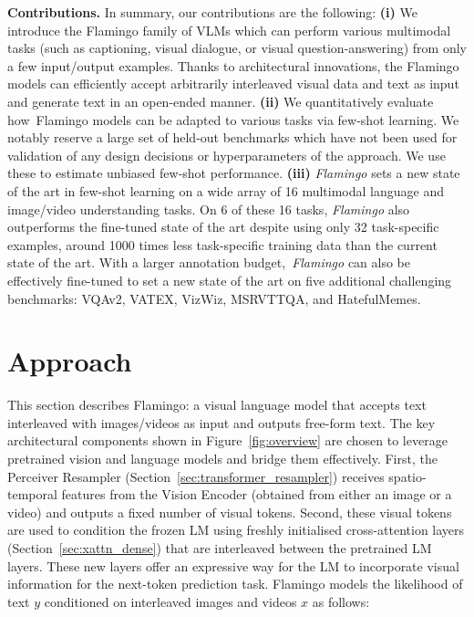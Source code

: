 \textbf{Contributions.}
In summary, our contributions are the following:
\textbf{(i)} We introduce the Flamingo family of VLMs which can perform various multimodal tasks (such as captioning, visual dialogue, or visual question-answering) from only a few input/output examples. Thanks to architectural innovations, the Flamingo models can efficiently accept arbitrarily interleaved visual data and text as input and generate text in an open-ended manner. 
\textbf{(ii)} We quantitatively evaluate how~Flamingo models can be adapted to various tasks via few-shot learning. We notably reserve a large set of held-out benchmarks which have not been used for validation of any design decisions or  hyperparameters of the approach. We use these to estimate unbiased few-shot performance.
\textbf{(iii)} \emph{Flamingo} sets a new state of the art in few-shot learning on a wide array of 16 multimodal language and image/video understanding tasks. On 6 of these 16 tasks, \emph{Flamingo} also outperforms the fine-tuned state of the art despite using only 32 task-specific examples, around 1000 times less task-specific training data than the current state of the art. With a larger annotation budget,~\emph{Flamingo} can also be effectively fine-tuned to set a new state of the art on five additional challenging benchmarks: VQAv2, VATEX, VizWiz, MSRVTTQA, and HatefulMemes.

\section{Approach}
\label{sec:approach}

This section describes Flamingo: a visual language model that accepts text interleaved with images/videos as input and outputs free-form text. The key architectural components shown in Figure~\ref{fig:overview}
are chosen to leverage pretrained vision and language models and bridge them effectively. First, the Perceiver Resampler (Section~\ref{sec:transformer_resampler}) receives spatio-temporal features from the Vision Encoder (obtained from either an image or a video) and outputs a fixed number of visual tokens. Second, these visual tokens are used to condition the frozen LM using freshly initialised cross-attention layers (Section~\ref{sec:xattn_dense}) that are interleaved between the pretrained LM layers. These new layers offer an expressive way for the LM to incorporate visual information for the next-token prediction task. Flamingo models the likelihood of text $y$ conditioned on interleaved  images and videos $x$ as follows:

